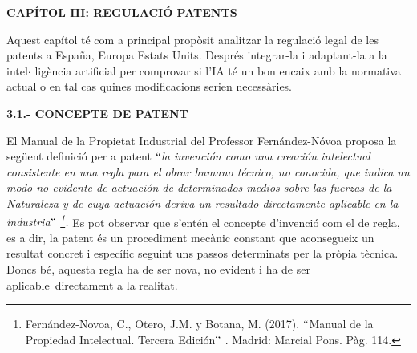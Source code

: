 \documentclass[12pt]{article}
\begin{document}
\vspace{\baselineskip}

\vspace{\baselineskip}
\begin{Center}
{\fontsize{16pt}{19.2pt}\selectfont \textbf{CAPÍTOL III: REGULACIÓ PATENTS}\par}
\end{Center}\par


\vspace{\baselineskip}

\vspace{\baselineskip}
\begin{justify}
Aquest capítol té com a principal propòsit analitzar la regulació legal de les patents a España, Europa Estats Units. Després integrar-la i adaptant-la a la intel$ \cdot $ ligència artificial per comprovar si l’IA té un bon encaix amb la normativa actual o en tal cas quines modificacions serien necessàries. 
\end{justify}\par


\vspace{\baselineskip}
\begin{justify}
\textbf{3.1.- CONCEPTE DE PATENT}
\end{justify}\par


\vspace{\baselineskip}
\begin{justify}
El Manual de la Propietat Industrial del Professor Fernández-Nóvoa proposa la següent definició per a patent $``$\textit{la invención como una creación intelectual consistente en una regla para el obrar humano técnico, no conocida, que indica un modo no evidente de actuación de determinados medios sobre las fuerzas de la Naturaleza y de cuya actuación deriva un resultado directamente aplicable en la industria$"$ \footnote{ Fernández-Novoa, C., Otero, J.M. y Botana, M. (2017). $``$Manual de la Propiedad Intelectual. Tercera Edición$"$ . Madrid: Marcial Pons. Pàg. 114. }. } Es pot observar que s’entén el concepte d’invenció com el de regla, es a dir, la patent és un procediment mecànic constant que aconsegueix un resultat concret i específic seguint uns passos determinats per la pròpia tècnica. Doncs bé, aquesta regla ha de ser nova, no evident i ha de ser aplicable\ directament  a la realitat.  
\end{justify}\par
\end{document}
